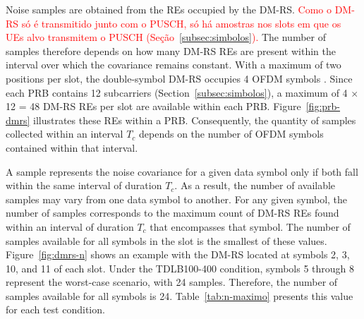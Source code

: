 Noise samples are obtained from the REs occupied by the DM-RS. \textcolor{red}{Como o DM-RS só é transmitido junto com o PUSCH, só há amostras nos slots em que os UEs alvo transmitem o PUSCH (Seção~\ref{subsec:simbolos}).} The number of samples therefore depends on how many DM-RS REs are present within the interval over which the covariance remains constant. With a maximum of two positions per slot, the double-symbol DM-RS occupies 4 OFDM symbols \cite[Tab.~6.4.1.1.3-4]{3gpp-ts38211}. Since each PRB contains 12 subcarriers (Section~\ref{subsec:simbolos}), a maximum of 4 $\times$ 12 = 48 DM-RS REs per slot are available within each PRB. Figure~\ref{fig:prb-dmrs} illustrates these REs within a PRB. Consequently, the quantity of samples collected within an interval $T_c$ depends on the number of OFDM symbols contained within that interval.



A sample represents the noise covariance for a given data symbol only if both fall within the same interval of duration $T_c$. As a result, the number of available samples may vary from one data symbol to another. For any given symbol, the number of samples corresponds to the maximum count of DM-RS REs found within an interval of duration $T_c$ that encompasses that symbol. The number of samples available for all symbols in the slot is the smallest of these values. Figure~\ref{fig:dmrs-n} shows an example with the DM-RS located at symbols 2, 3, 10, and 11 of each slot. Under the TDLB100-400 condition, symbols 5 through 8 represent the worst-case scenario, with 24 samples. Therefore, the number of samples available for all symbols is 24. Table~\ref{tab:n-maximo} presents this value for each test condition.

